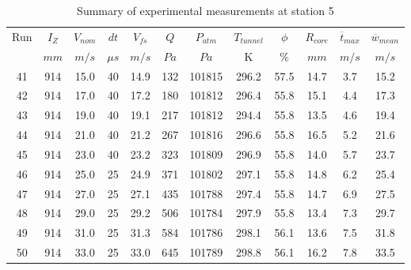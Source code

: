 \begin{table}[H]
\begin{center}
\begin{tabular}{|cccccccccccc|}
	\hline
	Run & $I_Z$ & $V_{nom}$ & $dt$ & $V_{fs}$ & $Q$ & $P_{atm}$ & $T_{tunnel}$ & $\phi$ & $R_{core}$ & $\overline{t}_{max}$ & $\overline{w}_{mean}$\\
	  & $mm$ & $m/s$ & $\mu s$ & $m/s$ & $Pa$ & $Pa$ & K & $\%$ & $mm$ & $m/s$ & $m/s$\\
	\hline
	41 & 914 & 15.0 & 40 & 14.9 & 132 & 101815 & 296.2 & 57.5 & 14.7 & 3.7 & 15.2\\
	42 & 914 & 17.0 & 40 & 17.2 & 180 & 101812 & 296.4 & 55.8 & 15.1 & 4.4 & 17.3\\
	43 & 914 & 19.0 & 40 & 19.1 & 217 & 101812 & 294.4 & 55.8 & 13.5 & 4.6 & 19.4\\
	44 & 914 & 21.0 & 40 & 21.2 & 267 & 101816 & 296.6 & 55.8 & 16.5 & 5.2 & 21.6\\
	45 & 914 & 23.0 & 40 & 23.2 & 323 & 101809 & 296.9 & 55.8 & 14.0 & 5.7 & 23.7\\
	46 & 914 & 25.0 & 25 & 24.9 & 371 & 101802 & 297.1 & 55.8 & 14.8 & 6.2 & 25.4\\
	47 & 914 & 27.0 & 25 & 27.1 & 435 & 101788 & 297.4 & 55.8 & 14.7 & 6.9 & 27.5\\
	48 & 914 & 29.0 & 25 & 29.2 & 506 & 101784 & 297.9 & 55.8 & 13.4 & 7.3 & 29.7\\
	49 & 914 & 31.0 & 25 & 31.3 & 584 & 101786 & 298.1 & 56.1 & 13.6 & 7.5 & 31.8\\
	50 & 914 & 33.0 & 25 & 33.0 & 645 & 101789 & 298.8 & 56.1 & 16.2 & 7.8 & 33.5\\
	\hline
\end{tabular}
\caption{Summary of experimental measurements at station 5}
\label{table:experiment_results_5}
\end{center}
\end{table}
